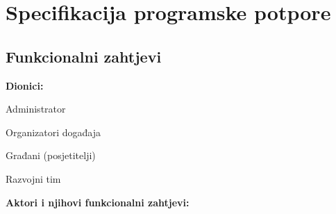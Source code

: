 \chapter{Specifikacija programske potpore}

\section{Funkcionalni zahtjevi}

\noindent \textbf{Dionici:}

\begin{packed_enum}
	
	\item Administrator
	\item Organizatori događaja
	\item Građani (posjetitelji)
	\item Razvojni tim				
	
\end{packed_enum}

\noindent \textbf{Aktori i njihovi funkcionalni zahtjevi:}


